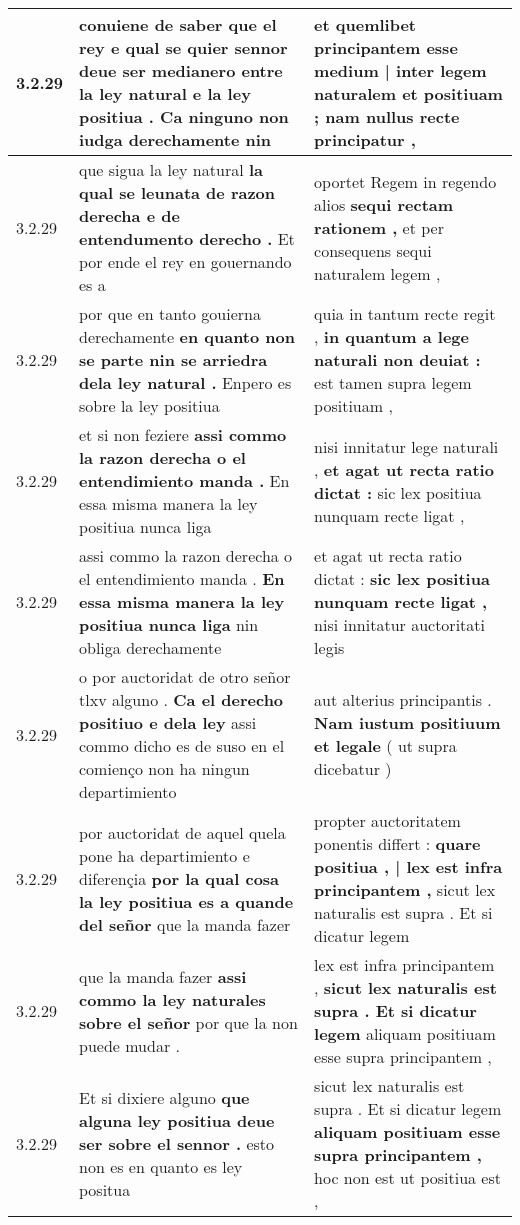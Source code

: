 \begin{tabular}{|p{1cm}|p{6.5cm}|p{6.5cm}|}
3.2.29 & conuiene de saber que el rey \textbf{ e qual se quier sennor deue ser medianero entre la ley natural e la ley positiua . } Ca ninguno non iudga derechamente nin & et quemlibet principantem \textbf{ esse medium | inter legem naturalem et positiuam ; } nam nullus recte principatur , \\\hline
3.2.29 & que sigua la ley natural \textbf{ la qual se leunata de razon derecha e de entendumento derecho . } Et por ende el rey en gouernando es a & oportet Regem in regendo alios \textbf{ sequi rectam rationem , } et per consequens sequi naturalem legem , \\\hline
3.2.29 & por que en tanto gouierna derechamente \textbf{ en quanto non se parte nin se arriedra dela ley natural . } Enpero es sobre la ley positiua & quia in tantum recte regit , \textbf{ in quantum a lege naturali non deuiat : } est tamen supra legem positiuam , \\\hline
3.2.29 & et si non feziere \textbf{ assi commo la razon derecha o el entendimiento manda . } En essa misma manera la ley positiua nunca liga & nisi innitatur lege naturali , \textbf{ et agat ut recta ratio dictat : } sic lex positiua nunquam recte ligat , \\\hline
3.2.29 & assi commo la razon derecha o el entendimiento manda . \textbf{ En essa misma manera la ley positiua nunca liga } nin obliga derechamente & et agat ut recta ratio dictat : \textbf{ sic lex positiua nunquam recte ligat , } nisi innitatur auctoritati legis \\\hline
3.2.29 & o por auctoridat de otro señor tlxv alguno . \textbf{ Ca el derecho positiuo e dela ley } assi commo dicho es de suso en el comienço non ha ningun departimiento & aut alterius principantis . \textbf{ Nam iustum positiuum et legale } ( ut supra dicebatur ) \\\hline
3.2.29 & por auctoridat de aquel quela pone ha departimiento e diferençia \textbf{ por la qual cosa la ley positiua es a quande del señor } que la manda fazer & propter auctoritatem ponentis differt : \textbf{ quare positiua , | lex est infra principantem , } sicut lex naturalis est supra . Et si dicatur legem \\\hline
3.2.29 & que la manda fazer \textbf{ assi commo la ley naturales sobre el señor } por que la non puede mudar . & lex est infra principantem , \textbf{ sicut lex naturalis est supra . Et si dicatur legem } aliquam positiuam esse supra principantem , \\\hline
3.2.29 & Et si dixiere alguno \textbf{ que alguna ley positiua deue ser sobre el sennor . } esto non es en quanto es ley positua & sicut lex naturalis est supra . Et si dicatur legem \textbf{ aliquam positiuam esse supra principantem , } hoc non est ut positiua est , \\\hline

\end{tabular}
